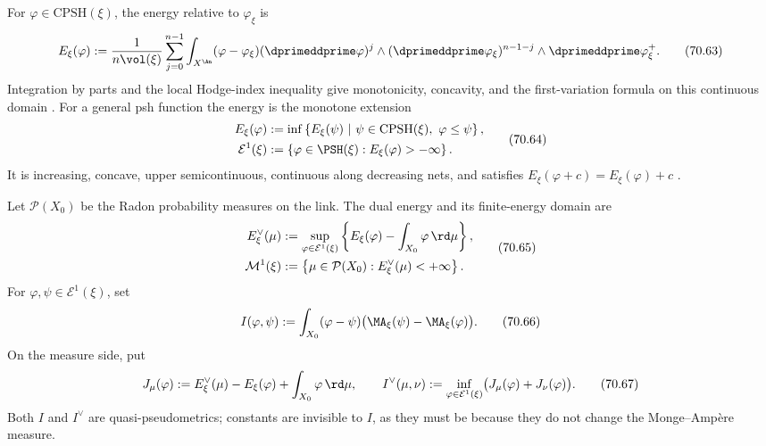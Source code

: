 For $\varphi\in\mathrm{CPSH}(\xi)$, the energy relative to
$\varphi_\xi$ is
\[
 E_\xi(\varphi)
 :=\frac{1}{n\vol(\xi)}
   \sum_{j=0}^{n-1}
   \int_{X^{\An}}
    (\varphi-\varphi_\xi)
    (\dprimeddprime\varphi)^j
    \wedge(\dprimeddprime\varphi_\xi)^{n-1-j}
    \wedge\dprimeddprime\varphi_\xi^+.
\tag{70.63}\label{eq:local-cone-continuous-energy}
\]
Integration by parts and the local Hodge-index inequality give monotonicity,
concavity, and the first-variation formula on this continuous domain
\cite[Propositions~3.8--3.9 and~4.2]{Wu24AffineCones}.  For a general psh
function the energy is the monotone extension
\[
\begin{aligned}
 E_\xi(\varphi)
 &:=\inf\left\{E_\xi(\psi)\ \middle|\
       \psi\in\mathrm{CPSH}(\xi),\ \varphi\leq\psi\right\},\\
 \mathcal E^1(\xi)
 &:=\left\{\varphi\in\PSH(\xi):E_\xi(\varphi)>-\infty\right\}.
\end{aligned}
\tag{70.64}\label{eq:local-cone-finite-energy}
\]
It is increasing, concave, upper semicontinuous, continuous along decreasing
nets, and satisfies $E_\xi(\varphi+c)=E_\xi(\varphi)+c$
\cite[Proposition~5.10]{Wu24AffineCones}.

Let $\mathcal P(X_0)$ be the Radon probability measures on the link.  The
dual energy and its finite-energy domain are
\[
\begin{aligned}
 E_\xi^\vee(\mu)
 &:=\sup_{\varphi\in\mathcal E^1(\xi)}
       \left\{E_\xi(\varphi)
       -\int_{X_0}\varphi\,\rd\mu\right\},\\
 \mathcal M^1(\xi)
 &:=\left\{\mu\in\mathcal P(X_0):E_\xi^\vee(\mu)<+\infty\right\}.
\end{aligned}
\tag{70.65}\label{eq:local-cone-dual-energy}
\]
For $\varphi,\psi\in\mathcal E^1(\xi)$, set
\[
 I(\varphi,\psi)
 :=\int_{X_0}(\varphi-\psi)
             \bigl(\MA_\xi(\psi)-\MA_\xi(\varphi)\bigr).
\tag{70.66}\label{eq:local-cone-I}
\]
On the measure side, put
\[
 J_\mu(\varphi)
 :=E_\xi^\vee(\mu)-E_\xi(\varphi)
        +\int_{X_0}\varphi\,\rd\mu,
 \qquad
 I^\vee(\mu,\nu)
 :=\inf_{\varphi\in\mathcal E^1(\xi)}
       \bigl(J_\mu(\varphi)+J_\nu(\varphi)\bigr).
\tag{70.67}\label{eq:local-cone-dual-I}
\]
Both $I$ and $I^\vee$ are quasi-pseudometrics; constants are invisible to
$I$, as they must be because they do not change the Monge--Amp\`ere
measure.

